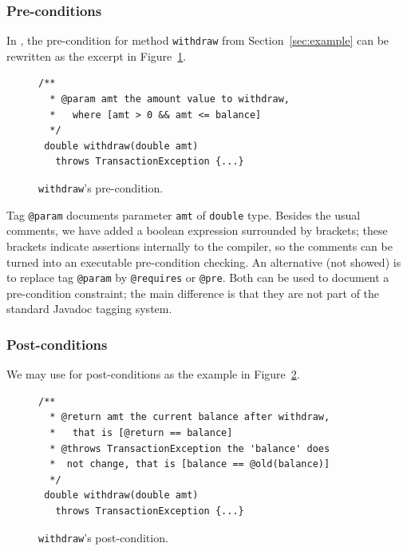 \subsubsection{Pre-conditions}
In \contractjdoc, the pre-condition for method \lstinline!withdraw! from Section~\ref{sec:example} can be rewritten as the excerpt in Figure~\ref{fig:pre-example}.

\begin{figure}
\centering
\begin{lstlisting}[basicstyle=\footnotesize\ttfamily,name=figxpi, frame=lines, mathescape=true]
 /**
  * @param amt the amount value to withdraw, 
  *   where [amt > 0 && amt <= balance]
  */
 double withdraw(double amt) 
   throws TransactionException {...}
\end{lstlisting}
\caption{\texttt{withdraw}'s pre-condition.}
\label{fig:pre-example}
\end{figure}

Tag \lstinline!@param! documents parameter \lstinline!amt! of \lstinline!double! type.
Besides the usual comments, we have added a boolean expression
surrounded by brackets; these brackets indicate assertions internally to the \contractjdoc{} compiler, so the comments can be turned into an executable pre-condition checking.
An alternative (not showed) is to replace tag \lstinline!@param! by \lstinline!@requires! or \lstinline!@pre!. Both can be used to document a pre-condition constraint; the main difference is that they are not part of the standard Javadoc tagging system.

\subsubsection{Post-conditions}

We may use \contractjdoc{} for post-conditions as the example in Figure~\ref{fig:post-example}.


\begin{figure}
\centering
\begin{lstlisting}[basicstyle=\footnotesize\ttfamily,name=figxpi, frame=lines, mathescape=true]
 /**
  * @return amt the current balance after withdraw,
  *   that is [@return == balance]
  * @throws TransactionException the 'balance' does
  *  not change, that is [balance == @old(balance)]
  */
 double withdraw(double amt) 
   throws TransactionException {...}
\end{lstlisting}
\caption{\texttt{withdraw}'s post-condition.}
\label{fig:post-example}
\end{figure}

